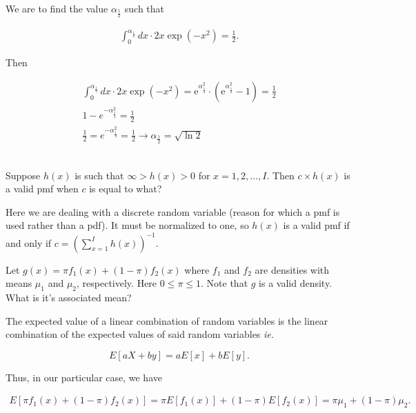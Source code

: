\documentclass{homework}
\begin{document}
We are to find the value $\alpha_{\frac{1}{2}}$ such that 

\begin{align*}
    \int_{0}^{\alpha_{\frac{1}{2}}} dx \cdot 2x \exp\left(-x^2 \right) = \frac{1}{2}.
\end{align*}

Then

\begin{align*}
    \int_{0}^{\alpha_{\frac{1}{2}}} dx \cdot 2x \exp\left(-x^2 \right) = \mathrm{e}^{\alpha_{\frac{1}{2}}^2}\cdot\left(\mathrm{e}^{\alpha_{\frac{1}{2}}^2}-1\right) = \frac{1}{2} \\
    1 - e^{-\alpha_{\frac{1}{2}}^{2}} = \frac{1}{2} \\
    \frac{1}{2} = e^{-\alpha_{\frac{1}{2}}^{2}} = \frac{1}{2} \longrightarrow \alpha_{\frac{1}{2}} = \sqrt{\ln 2}
\end{align*} \\

\begin{tcolorbox}[title=Question 10]
Suppose $h(x)$ is such that $\infty > h(x) > 0$ for $x=1,2,\ldots, I$. Then $c\times h(x)$ is a valid pmf when $c$ is equal to what?
\end{tcolorbox}

Here we are dealing with a discrete random variable (reason for which a pmf is used rather than a pdf). It must be normalized to one, so $h(x)$ is a valid pmf if and only if $c= 
\left(\sum_{x=1}^I h(x) \right)^{-1}$. \\

\begin{tcolorbox}[title=Question 11]
Let $g(x) = \pi f_1(x) + (1 - \pi)f_2(x)$ where $f_1$ and $f_2$ are densities with means $\mu_1$ and $\mu_2$, respectively. Here $0 \leq \pi \leq 1$. Note that $g$ is a valid density. What is it's associated mean?
\end{tcolorbox}

The expected value of a linear combination of random variables is the linear combination of the expected values of said random variables \textit{ie.}

$$
E[aX+by] = a E[x]+bE[y].
$$

Thus, in our particular case, we have

\begin{align*}
    E[\pi f_1(x) + (1 - \pi)f_2(x)] = \pi E[f_1(x)] + (1 - \pi) E[f_2(x)] = \pi \mu_1 + (1-\pi) \mu_2. 
\end{align*}\\
\end{document}
